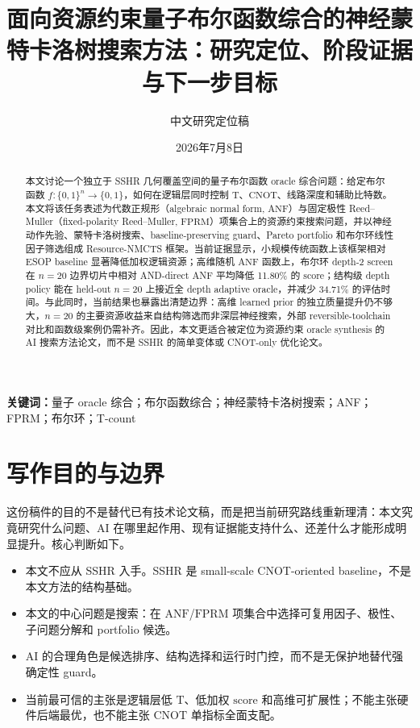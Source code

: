 \documentclass[UTF8,fontset=macnew,11pt]{ctexart}
\title{面向资源约束量子布尔函数综合的神经蒙特卡洛树搜索方法：研究定位、阶段证据与下一步目标}
\author{中文研究定位稿}
\date{2026年7月8日}
\newcommand{\method}{Resource-NMCTS}
\newcommand{\anf}{\ensuremath{\mathrm{ANF}}}
\newcommand{\fprm}{\ensuremath{\mathrm{FPRM}}}
\newcommand{\score}{\ensuremath{\mathrm{score}}}
\newcommand{\cnot}{\ensuremath{\mathrm{CNOT}}}
\newcommand{\tcount}{\ensuremath{\mathrm{T}}}
\begin{document}
\pagestyle{plain}
\maketitle

\begin{abstract}
本文讨论一个独立于 SSHR 几何覆盖空间的量子布尔函数 oracle 综合问题：给定布尔函数 $f:\{0,1\}^n\rightarrow\{0,1\}$，如何在逻辑层同时控制 \tcount{}、\cnot{}、线路深度和辅助比特数。本文将该任务表述为代数正规形（algebraic normal form, \anf{}）与固定极性 Reed--Muller（fixed-polarity Reed--Muller, \fprm{}）项集合上的资源约束搜索问题，并以神经动作先验、蒙特卡洛树搜索、baseline-preserving guard、Pareto portfolio 和布尔环线性因子筛选组成 \method{} 框架。当前证据显示，小规模传统函数上该框架相对 ESOP baseline 显著降低加权逻辑资源；高维随机 \anf{} 函数上，布尔环 depth-2 screen 在 $n=20$ 边界切片中相对 AND-direct ANF 平均降低 11.80\% 的 \score{}；结构级 depth policy 能在 held-out $n=20$ 上接近全 depth adaptive oracle，并减少 34.71\% 的评估时间。与此同时，当前结果也暴露出清楚边界：高维 learned prior 的独立质量提升仍不够大，$n=20$ 的主要资源收益来自结构筛选而非深层神经搜索，外部 reversible-toolchain 对比和函数级案例仍需补齐。因此，本文更适合被定位为资源约束 oracle synthesis 的 AI 搜索方法论文，而不是 SSHR 的简单变体或 CNOT-only 优化论文。
\end{abstract}

\noindent\textbf{关键词：}量子 oracle 综合；布尔函数综合；神经蒙特卡洛树搜索；ANF；FPRM；布尔环；T-count

\section*{写作目的与边界}

这份稿件的目的不是替代已有技术论文稿，而是把当前研究路线重新理清：本文究竟研究什么问题、AI 在哪里起作用、现有证据能支持什么、还差什么才能形成明显提升。核心判断如下。

\begin{itemize}
  \item 本文不应从 SSHR 入手。SSHR 是 small-scale CNOT-oriented baseline，不是本文方法的结构基础。
  \item 本文的中心问题是搜索：在 \anf{}/\fprm{} 项集合中选择可复用因子、极性、子问题分解和 portfolio 候选。
  \item AI 的合理角色是候选排序、结构选择和运行时门控，而不是无保护地替代强确定性 guard。
  \item 当前最可信的主张是逻辑层低 \tcount{}、低加权 \score{} 和高维可扩展性；不能主张硬件后端最优，也不能主张 \cnot{} 单指标全面支配。
\end{itemize}
\end{document}
